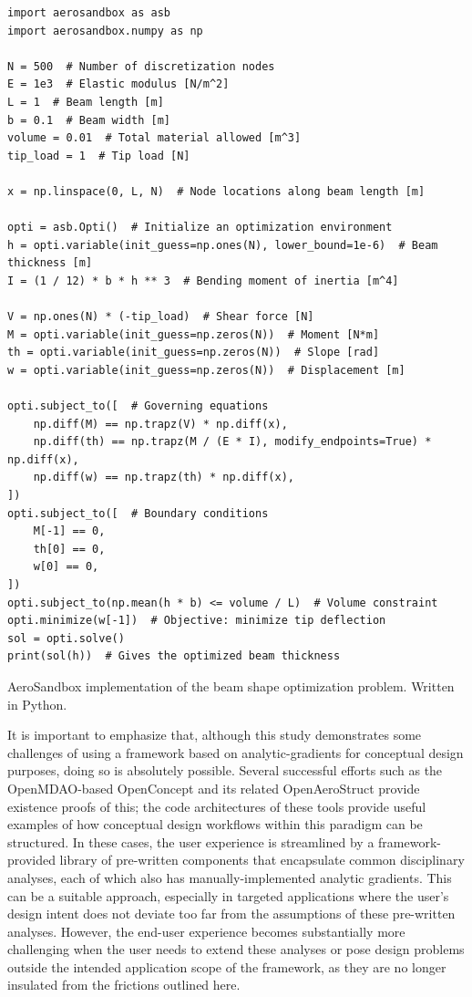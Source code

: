 \begin{listing}[h]
    \begin{verbatim}
import aerosandbox as asb
import aerosandbox.numpy as np

N = 500  # Number of discretization nodes
E = 1e3  # Elastic modulus [N/m^2]
L = 1  # Beam length [m]
b = 0.1  # Beam width [m]
volume = 0.01  # Total material allowed [m^3]
tip_load = 1  # Tip load [N]

x = np.linspace(0, L, N)  # Node locations along beam length [m]

opti = asb.Opti()  # Initialize an optimization environment
h = opti.variable(init_guess=np.ones(N), lower_bound=1e-6)  # Beam thickness [m]
I = (1 / 12) * b * h ** 3  # Bending moment of inertia [m^4]

V = np.ones(N) * (-tip_load)  # Shear force [N]
M = opti.variable(init_guess=np.zeros(N))  # Moment [N*m]
th = opti.variable(init_guess=np.zeros(N))  # Slope [rad]
w = opti.variable(init_guess=np.zeros(N))  # Displacement [m]

opti.subject_to([  # Governing equations
    np.diff(M) == np.trapz(V) * np.diff(x),
    np.diff(th) == np.trapz(M / (E * I), modify_endpoints=True) * np.diff(x),
    np.diff(w) == np.trapz(th) * np.diff(x),
])
opti.subject_to([  # Boundary conditions
    M[-1] == 0,
    th[0] == 0,
    w[0] == 0,
])
opti.subject_to(np.mean(h * b) <= volume / L)  # Volume constraint
opti.minimize(w[-1])  # Objective: minimize tip deflection
sol = opti.solve()
print(sol(h))  # Gives the optimized beam thickness
    \end{verbatim}
    \caption{AeroSandbox implementation of the beam shape optimization problem. Written in Python.}
    \label{lst:om_beam}
\end{listing}

It is important to emphasize that, although this study demonstrates some challenges of using a framework based on analytic-gradients for conceptual design purposes, doing so is absolutely possible. Several successful efforts such as the OpenMDAO-based OpenConcept \cite{Brelje2018a} and its related OpenAeroStruct \cite{Adler2022d} provide existence proofs of this; the code architectures of these tools provide useful examples of how conceptual design workflows within this paradigm can be structured. In these cases, the user experience is streamlined by a framework-provided library of pre-written components that encapsulate common disciplinary analyses, each of which also has manually-implemented analytic gradients. This can be a suitable approach, especially in targeted applications where the user's design intent does not deviate too far from the assumptions of these pre-written analyses. However, the end-user experience becomes substantially more challenging when the user needs to extend these analyses or pose design problems outside the intended application scope of the framework, as they are no longer insulated from the frictions outlined here.

